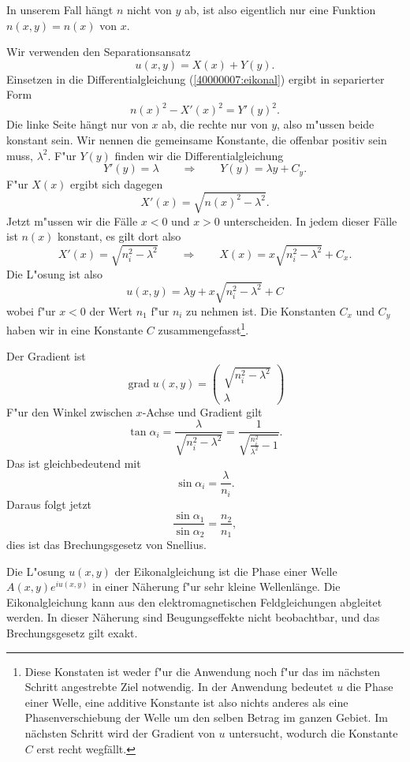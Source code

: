 \begin{loesung}
In unserem Fall hängt $n$ nicht von $y$ ab, ist also eigentlich
nur eine Funktion $n(x,y)=n(x)$ von $x$.
\begin{teilaufgaben}
\item
Wir verwenden den Separationsansatz
\[
u(x,y)=X(x) + Y(y).
\]
Einsetzen in die Differentialgleichung
(\ref{40000007:eikonal}) ergibt in separierter Form
\[
n(x)^2-X'(x)^2=Y'(y)^2.
\]
Die linke Seite hängt nur von $x$ ab, die rechte nur von $y$,
also m"ussen beide konstant sein.
Wir nennen die gemeinsame Konstante, die offenbar positiv sein
muss, $\lambda^2$.
F"ur $Y(y)$ finden wir die Differentialgleichung
\[
Y'(y)=\lambda \qquad\Rightarrow\qquad Y(y)=\lambda y+ C_y.
\]
F"ur $X(x)$ ergibt sich dagegen
\[
X'(x)=\sqrt{n(x)^2-\lambda^2}.
\]
Jetzt m"ussen wir die Fälle $x<0$ und $x>0$ unterscheiden.
In jedem dieser Fälle ist $n(x)$ konstant, es gilt dort
also
\[
X'(x)=\sqrt{n_i^2-\lambda^2}
\qquad
\Rightarrow
\qquad
X(x)=x\sqrt{n_i^2-\lambda^2} + C_x.
\]
Die L"osung ist also
\[
u(x,y)=\lambda y + x\sqrt{n_i^2-\lambda^2} + C
\]
wobei f"ur $x<0$ der Wert $n_1$ f"ur $n_i$ zu nehmen ist.
Die Konstanten $C_x$ und $C_y$ haben wir in eine Konstante $C$
zusammengefasst\footnote{Diese Konstaten ist weder f"ur die Anwendung noch
f"ur das im nächsten Schritt angestrebte Ziel notwendig. In der Anwendung
bedeutet $u$ die Phase einer Welle, eine additive Konstante ist also nichts
anderes als eine Phasenverschiebung der Welle um den selben Betrag
im ganzen Gebiet. Im nächsten Schritt wird der Gradient von $u$ untersucht,
wodurch die Konstante $C$ erst recht wegfällt.}.
\item
Der Gradient ist
\[
\operatorname{grad}u(x,y)
=
\begin{pmatrix}
\sqrt{n_i^2-\lambda^2}\\
\lambda
\end{pmatrix}
\]
F"ur den Winkel zwischen $x$-Achse und Gradient gilt
\[
\tan\alpha_i
=
\frac{\lambda}{\sqrt{n_i^2-\lambda^2}}
=
\frac1{\sqrt{\frac{n_i^2}{\lambda^2}-1}}.
\]
Das ist gleichbedeutend mit
\[
\sin\alpha_i=\frac{\lambda}{n_i}.
\]
Daraus folgt jetzt
\[
\frac{ \sin\alpha_1}{\sin\alpha_2}=\frac{n_2}{n_1},
\]
dies ist das Brechungsgesetz von Snellius.
\qedhere
\end{teilaufgaben}
\end{loesung}

\begin{diskussion}
Die L"osung $u(x,y)$ der Eikonalgleichung ist die Phase einer Welle
$A(x,y)e^{iu(x,y)}$ in einer Näherung f"ur sehr kleine Wellenlänge.
Die Eikonalgleichung kann aus den elektromagnetischen Feldgleichungen
abgleitet werden.
In dieser Näherung sind Beugungseffekte nicht beobachtbar, und das
Brechungsgesetz gilt exakt.
\end{diskussion}
